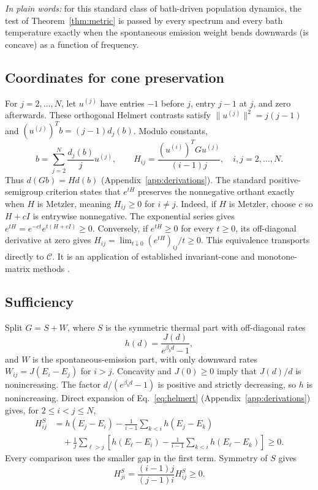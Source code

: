\documentclass[11pt,a4paper]{article}
\theoremstyle{remark}\newtheorem{remark}[theorem]{Remark}
\newcommand{\C}{\mathcal C}
\newcommand{\takeaway}[1]{\par\smallskip\noindent\textit{In plain words:} #1\par\smallskip}
\begin{document}
\takeaway{for this standard class of bath-driven population dynamics, the test of Theorem~\ref{thm:metric} is passed by every spectrum and every bath temperature exactly when the spontaneous emission weight bends downwards (is concave) as a function of frequency.}

\subsection{Coordinates for cone preservation}
For $j=2,\ldots,N$, let $u^{(j)}$ have entries $-1$ before $j$, entry $j-1$ at $j$, and zero afterwards. These orthogonal Helmert contrasts satisfy $\|u^{(j)}\|^2=j(j-1)$ and $(u^{(j)})^Tb=(j-1)d_j(b)$. Modulo constants,
\begin{equation}
 b=\sum_{j=2}^N\frac{d_j(b)}{j}u^{(j)},\qquad
 H_{ij}=\frac{(u^{(i)})^TGu^{(j)}}{(i-1)j},\quad i,j=2,\ldots,N.
 \label{eq:helmert}
\end{equation}
Thus $d(Gb)=Hd(b)$ (Appendix~\ref{app:derivations}). The standard positive-semigroup criterion states that $e^{tH}$ preserves the nonnegative orthant exactly when $H$ is Metzler, meaning $H_{ij}\ge0$ for $i\ne j$. Indeed, if $H$ is Metzler, choose $c$ so $H+cI$ is entrywise nonnegative. The exponential series gives $e^{tH}=e^{-ct}e^{t(H+cI)}\ge0$. Conversely, if $e^{tH}\ge0$ for every $t\ge0$, its off-diagonal derivative at zero gives $H_{ij}=\lim_{t\downarrow0}(e^{tH})_{ij}/t\ge0$. This equivalence transports directly to $\C$. It is an application of established invariant-cone and monotone-matrix methods \cite{KeilsonKester1977,Massey1987,Lorek2012}.

\subsection{Sufficiency}
Split $G=S+W$, where $S$ is the symmetric thermal part with off-diagonal rates
\begin{equation}
 h(d)=\frac{J(d)}{e^{\beta_b d}-1},
\end{equation}
and $W$ is the spontaneous-emission part, with only downward rates $W_{ij}=J(E_i-E_j)$ for $i>j$. Concavity and $J(0)\ge0$ imply that $J(d)/d$ is nonincreasing. The factor $d/(e^{\beta_b d}-1)$ is positive and strictly decreasing, so $h$ is nonincreasing. Direct expansion of Eq.~\eqref{eq:helmert} (Appendix~\ref{app:derivations}) gives, for $2\le i<j\le N$,
\begin{align}
 H^S_{ij}
 &=h(E_j-E_i)-\frac1{i-1}\sum_{k<i}h(E_j-E_k)\nonumber\\
 &\quad+\frac1j\sum_{\ell>j}\left[h(E_\ell-E_i)
       -\frac1{i-1}\sum_{k<i}h(E_\ell-E_k)\right]\ge0.
 \label{eq:thermalH}
\end{align}
Every comparison uses the smaller gap in the first term. Symmetry of $S$ gives
\begin{equation}
 H^S_{ji}=\frac{(i-1)j}{(j-1)i}H^S_{ij}\ge0.
\end{equation}
\end{document}
